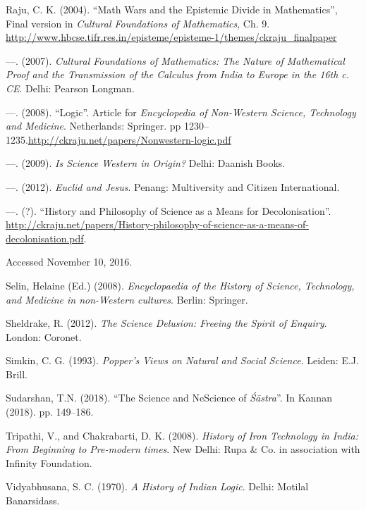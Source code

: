 \begin{thebibliography}{99}
  Raju, C. K. (2004). “Math Wars and the Epistemic Divide in Mathematics”, Final version in \textit{Cultural Foundations of Mathematics}, Ch. 9. \url{http://www.hbcse.tifr.res.in/episteme/episteme-1/themes/ckraju_finalpaper}

  —. (2007). \textit{Cultural Foundations of Mathematics: The Nature of Mathematical Proof and the Transmission of the Calculus from India to Europe in the 16th c. CE}. Delhi: Pearson Longman.

  —. (2008). “Logic”. Article for \textit{Encyclopedia of Non-Western Science, Technology and Medicine}. Netherlands: Springer. pp 1230--1235.\break \url{http://ckraju.net/papers/Nonwestern-logic.pdf}

  —. (2009). \textit{Is Science Western in Origin?} Delhi: Daanish Books.

  —. (2012). \textit{Euclid and Jesus}. Penang: Multiversity and Citizen International.

  —. (?). “History and Philosophy of Science as a Means for Decolonisation”. \url{http://ckraju.net/papers/History-philosophy-of-science-as-a-means-of-decolonisation.pdf}. 
 
 Accessed November 10, 2016.

  Selin, Helaine (Ed.) (2008). \textit{Encyclopaedia of the History of Science, Technology, and Medicine in non-Western cultures}. Berlin: Springer.

  Sheldrake, R. (2012). \textit{The Science Delusion: Freeing the Spirit of Enquiry}. London: Coronet.

  Simkin, C. G. (1993). \textit{Popper's Views on Natural and Social Science}. Leiden: E.J. Brill.

  Sudarshan, T.N. (2018). “The Science and NeScience of \textit{Śāstra}”. In Kannan (2018). pp. 149--186.

  Tripathi, V., and Chakrabarti, D. K. (2008). \textit{History of Iron Technology in India: From Beginning to Pre-modern times}. New Delhi: Rupa \& Co. in association with Infinity Foundation.

  Vidyabhusana, S. C. (1970). \textit{A History of Indian Logic}. Delhi: Motilal Banarsidass.

 \end{thebibliography}

\theendnotes


